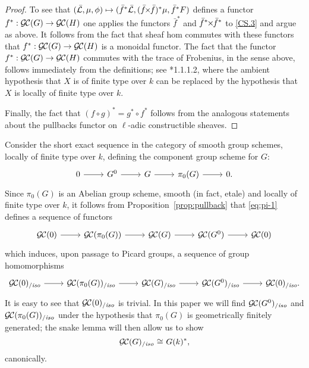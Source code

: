 \documentclass[11pt]{amsart}
\theoremstyle{plain}
\theoremstyle{definition}
\theoremstyle{remark}
\newcommand{\EE}{\mathbb{\bar Q}_\ell}
\newcommand{\Fq}{k}
\DeclareMathOperator{\Hom}{Hom}
\newcommand{\iso}{{\ \cong\ }}
\newcommand{\gcs}[1]{{\mathcal{\bar #1}}}
\newcommand{\GC}{{\mathcal{G\hskip-0.8pt C}}}
\newcommand{\GCiso}[1]{\GC(#1)_{/\textit{iso}}}
\renewcommand{\bf}{\bar{f}}
\newcommand{\tight}[3]{\hspace{-#1pt}{#2}\hspace{-#3pt}}
\newcommand{\bfxf}{\text{$\bar{f} \tight{1}{\times}{1} \bar{f}$}}
\newcommand\David[1]{\marginpar{\smaller\smaller DR: #1}}
\begin{document}
\begin{proof}
  To see that $(\gcs{L},\mu,\phi) \mapsto (\bf^*\gcs{L},(\bfxf)^*\mu,\bf^*F)$
  defines a functor $f^* : \GC(G) \to \GC(H)$ one applies the functors $\bf^*$ and
  $\bf^*\tight{1}{\times}{1}\bf^*$ to \ref{CS.3} and argue as
  above. It follows from the fact that sheaf hom commutes with these
  functors that $f^* : \GC(G) \to \GC(H)$ is a monoidal functor.
%
  The fact that the functor $f^* : \GC(G) \to \GC(H)$ commutes with
  the trace of Frobenius, in the sense above, follows immediately from
  the definitions; see \cite{Laumon}*{1.1.1.2}, where the ambient
  hypothesis that $X$ is of finite type over $\Fq$ can be replaced by
  the hypothesis that $X$ is locally of finite type over $\Fq$.
  
  Finally, the fact that $(f\circ g)^* = g^* \circ f^*$ follows from the analogous
  statements about the pullbacks functor on $\ell$-adic constructible sheaves.
\end{proof}

Consider the short exact sequence in the category of smooth group
schemes, locally of finite type over $\Fq$, defining the component
group scheme for $G$:
\begin{equation}\label{eq:pi-2}
\begin{tikzcd}
0 \rar & G^0 \rar & G \rar & \pi_0(G) \rar & 0.
\end{tikzcd}
\end{equation}
Since $\pi_0(G)$ is an Abelian group scheme, smooth (in fact, etale) and locally of finite type over $\Fq$, 
it follows from Proposition~\ref{prop:pullback} that \eqref{eq:pi-1} defines a sequence of functors
\[
\begin{tikzcd}
\GC(0) \rar & \GC(\pi_0(G)) \rar & \GC(G) \rar & \GC(G^0) \rar & \GC(0)
\end{tikzcd}
\]
which induces, upon passage to Picard groups, a sequence of group homomorphisms 
\begin{equation}\label{eq:pi-1}
\begin{tikzcd}
\GCiso{0} \rar & \GCiso{\pi_0(G)} \rar & \GCiso{G} \rar & \GCiso{G^0} \rar & \GCiso{0}.
\end{tikzcd}
\end{equation}
It is easy to see that $\GCiso{0}$ is trivial. In this paper we will find $\GCiso{G^0}$ and $\GCiso{\pi_0(G)}$ under the hypothesis that $\pi_0(G)$ is geometrically finitely generated; 
the snake lemma will then allow us to show
\[
\GCiso{G} \iso G(\Fq)^*,%
\]
canonically.
\end{document}
